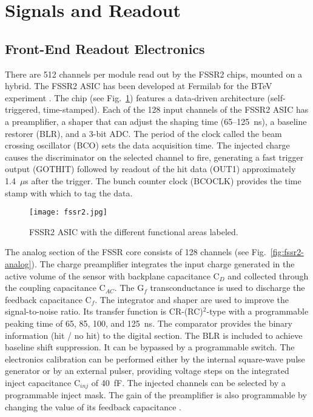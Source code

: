 \section{Signals and Readout}

\subsection{Front-End Readout Electronics}

There are 512 channels per module read out by the FSSR2 chips, mounted on a hybrid. The FSSR2 ASIC has been
developed at Fermilab for the BTeV experiment \cite{FSSR}. The chip (see Fig.~\ref{fig:fssr2}) features a
data-driven architecture (self-triggered, time-stamped). Each of the 128 input channels of the FSSR2 ASIC has a
preamplifier, a shaper that can adjust the shaping time (65--125~ns), a baseline restorer (BLR), and a 3-bit ADC.
The period of the clock called the beam crossing oscillator (BCO) sets the data acquisition time. The injected charge
causes the discriminator on the selected channel to fire, generating a fast trigger output (GOTHIT) followed by
readout of the hit data (OUT1) approximately 1.4~$\mu$s after the trigger. The bunch counter clock (BCOCLK)
provides the time stamp with which to tag the data. 

\begin{figure}[hbt] 
\centering 
\texttt{[image: fssr2.jpg]}
\caption{FSSR2 ASIC with the different functional areas labeled.}
\label{fig:fssr2}
\end{figure}

The analog section of the FSSR core consists of 128 channels (see Fig.~\ref{fig:fssr2-analog}). The charge
preamplifier integrates the input charge generated in the active volume of the sensor with backplane capacitance
C$_D$ and collected through the coupling capacitance C$_{AC}$. The G$_f$ transconductance is used to discharge
the feedback capacitance C$_f$. The integrator and shaper are used to improve the signal-to-noise ratio. Its
transfer function is CR-(RC)$^2$-type with a programmable peaking time of 65, 85, 100, and 125~ns. The comparator
provides the binary information (hit / no hit) to the digital section. The BLR is included to achieve baseline shift
suppression. It can be bypassed by a programmable switch. The electronics calibration can be performed either by
the internal square-wave pulse generator or by an external pulser, providing voltage steps on the integrated inject
capacitance C$_{inj}$ of 40~fF. The injected channels can be selected by a programmable inject mask.  The gain of
the preamplifier is also programmable by changing the value of its feedback capacitance \cite{DINARDOTHESIS}.


